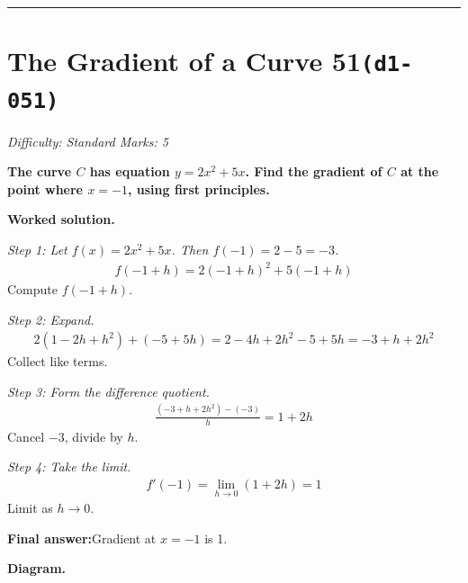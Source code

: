 \documentclass[11pt]{article}
\newcommand{\question}[1]{\par\medskip\noindent\textbf{#1}\par}
\begin{document}
\medskip\hrule

\section*{The Gradient of a Curve 51\quad\small\texttt{(d1-051)}}
\textit{Difficulty: Standard \quad\textbar\quad Marks: 5}

\question{The curve \( C \) has equation \( y = 2x^2 + 5x \). Find the gradient of \( C \) at the point where \( x = -1 \), using first principles.}

\textbf{Worked solution.}

\textit{Step 1: Let \( f(x) = 2x^2 + 5x \). Then \( f(-1) = 2 - 5 = -3 \).}
\[\begin{gathered}
f(-1 + h) = 2(-1+h)^2 + 5(-1+h)
\end{gathered}\]
Compute \( f(-1+h) \).

\textit{Step 2: Expand.}
\[\begin{gathered}
2(1 - 2h + h^2) + (-5 + 5h) = 2 - 4h + 2h^2 - 5 + 5h = -3 + h + 2h^2
\end{gathered}\]
Collect like terms.

\textit{Step 3: Form the difference quotient.}
\[\begin{gathered}
\frac{(-3 + h + 2h^2) - (-3)}{h} = 1 + 2h
\end{gathered}\]
Cancel \( -3 \), divide by \( h \).

\textit{Step 4: Take the limit.}
\[\begin{gathered}
f'(-1) = \lim_{h \to 0}(1 + 2h) = 1
\end{gathered}\]
Limit as \( h \to 0 \).

\begin{answerbox}
\textbf{Final answer:}\quad Gradient at \(\displaystyle  x = -1 \) is 1.
\end{answerbox}
\textbf{Diagram.}
\end{document}
